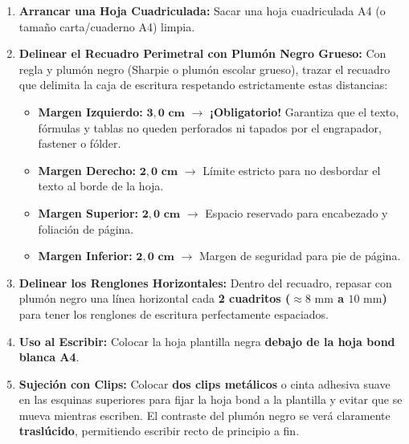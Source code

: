 \documentclass[a4paper, 10pt]{article}
\begin{document}
\vspace{0.05cm}

\begin{tcolorbox}[title=Paso a Paso: Fabricación y Uso de la Plantilla Traslúcida, colframe=uni-red]
    \footnotesize
    \begin{enumerate}[leftmargin=1.5em, itemsep=3pt]
        \item \textbf{Arrancar una Hoja Cuadriculada:} Sacar una hoja cuadriculada A4 (o tamaño carta/cuaderno A4) limpia.
        \item \textbf{Delinear el Recuadro Perimetral con Plumón Negro Grueso:} Con regla y plumón negro (Sharpie o plumón escolar grueso), trazar el recuadro que delimita la caja de escritura respetando estrictamente estas distancias:
        \begin{itemize}[leftmargin=1.3em, itemsep=1.5pt]
            \item \textbf{Margen Izquierdo:} $\mathbf{3{,}0\text{ cm}}$ $\longrightarrow$ \textbf{¡Obligatorio!} Garantiza que el texto, fórmulas y tablas no queden perforados ni tapados por el engrapador, fastener o fólder.
            \item \textbf{Margen Derecho:} $\mathbf{2{,}0\text{ cm}}$ $\longrightarrow$ Límite estricto para no desbordar el texto al borde de la hoja.
            \item \textbf{Margen Superior:} $\mathbf{2{,}0\text{ cm}}$ $\longrightarrow$ Espacio reservado para encabezado y foliación de página.
            \item \textbf{Margen Inferior:} $\mathbf{2{,}0\text{ cm}}$ $\longrightarrow$ Margen de seguridad para pie de página.
        \end{itemize}
        \item \textbf{Delinear los Renglones Horizontales:} Dentro del recuadro, repasar con plumón negro una línea horizontal cada \textbf{2 cuadritos ($\approx 8\text{ mm}$ a $10\text{ mm}$)} para tener los renglones de escritura perfectamente espaciados.
        \item \textbf{Uso al Escribir:} Colocar la hoja plantilla negra \textbf{debajo de la hoja bond blanca A4}. 
        \item \textbf{Sujeción con Clips:} Colocar \textbf{dos clips metálicos} o cinta adhesiva suave en las esquinas superiores para fijar la hoja bond a la plantilla y evitar que se mueva mientras escriben. El contraste del plumón negro se verá claramente \textbf{traslúcido}, permitiendo escribir recto de principio a fin.
    \end{enumerate}
\end{tcolorbox}
\end{document}
